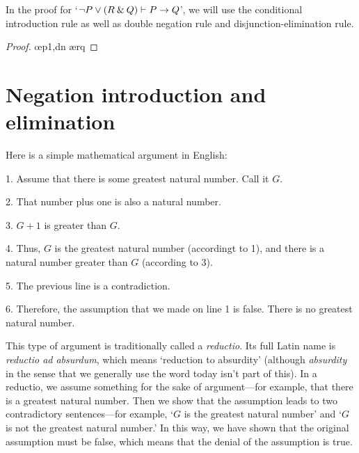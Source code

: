 \begin{earg}
\item In the proof for `${\neg} P \vee (R \mathbin{\&} Q) \vdash P \rightarrow Q$', we will use the conditional introduction rule as well as double negation rule and disjunction-elimination rule. 

\begin{proof}
	 \pr{}	
	\open
		\as{}
		 
		 \oe{p1,dn}
		 \ae{rq}
	\close
\end{proof}


\end{earg}


\section{Negation introduction and elimination}\label{s:neg-rules}

Here is a simple mathematical argument in English:
\begin{earg}
\item[1.] Assume that there is some greatest natural number. Call it $G$.
\item[2.] That number plus one is also a natural number.
\item[3.] $G+1$ is greater than $G$.
\item[4.] Thus, $G$ is the greatest natural number (accordingt to 1), and there is a natural number greater than $G$ (according to 3).
\item[5.] The previous line is a contradiction.
\item[6.] Therefore, the assumption that we made on line 1 is false. There is no greatest natural number.
\end{earg}
This type of argument is traditionally called a \emph{reductio}. Its full Latin name is \emph{reductio ad absurdum}, which means `reduction to absurdity' (although \textit{absurdity} in the sense that we generally use the word today isn't part of this). In a reductio, we assume something for the sake of argument---for example, that there is a greatest natural number. Then we show that the assumption leads to two contradictory sentences---for example, `$G$ is the greatest natural number' and `$G$ is not the greatest natural number.' In this way, we have shown that the original assumption must be false, which means that the denial of the assumption is true. 

